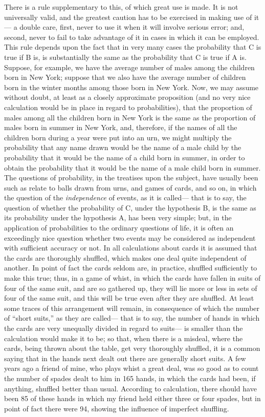 There is a rule supplementary to this, of which great use is made. It is not universally valid, and the greatest caution has to be exercised in making use of it--- a double care, first, never to use it when it will involve serious error; and, second, never to fail to take advantage of it in cases in which it can be employed. This rule depends upon the fact that in very many cases the probability that C is true if B is, is substantially the same as the probability that C is true if A is. Suppose, for example, we have the average number of males among the children born in New York; suppose that we also have the average number of children born in the winter months among those born in New York. Now, we may assume without doubt, at least as a closely approximate proposition (and no very nice calculation would be in place in regard to probabilities), that the proportion of males among all the children born in New York is the same as the proportion of males born in summer in New York, and, therefore, if the names of all the children born during a year were put into an urn, we might multiply the probability that any name drawn would be the name of a male child by the probability that it would be the name of a child born in summer, in order to obtain the probability that it would be the name of a male child born in summer. The questions of probability, in the treatises upon the subject, have usually been such as relate to balls drawn from urns, and games of cards, and so on, in which the question of the \emph{independence} of events, as it is called--- that is to say, the question of whether the probability of C, under the hypothesis B, is the same as its probability under the hypothesis A, has been very simple; but, in the application of probabilities to the ordinary questions of life, it is often an exceedingly nice question whether two events may be considered as independent with sufficient accuracy or not. In all calculations about cards it is assumed that the cards are thoroughly shuffled, which makes one deal quite independent of another. In point of fact the cards seldom are, in practice, shuffled sufficiently to make this true; thus, in a game of whist, in which the cards have fallen in suits of four of the same suit, and are so gathered up, they will lie more or less in sets of four of the same suit, and this will be true even after they are shuffled. At least some traces of this arrangement will remain, in consequence of which the number of ``short suits,'' as they are called--- that is to say, the number of hands in which the cards are very unequally divided in regard to suits--- is smaller than the calculation would make it to be; so that, when there is a misdeal, where the cards, being thrown about the table, get very thoroughly shuffled, it is a common saying that in the hands next dealt out there are generally short suits. A few years ago a friend of mine, who plays whist a great deal, was so good as to count the number of spades dealt to him in 165 hands, in which the cards had been, if anything, shuffled better than usual. According to calculation, there should have been 85 of these hands in which my friend held either three or four spades, but in point of fact there were 94, showing the influence of imperfect shuffling.

